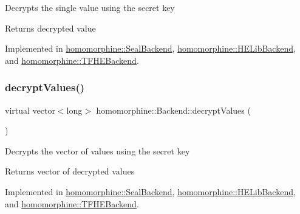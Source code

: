 Decrypts the single value using the secret key

\begin{DoxyReturn}{Returns}
decrypted value 
\end{DoxyReturn}


Implemented in \mbox{\hyperlink{classhomomorphine_1_1_seal_backend_a0496053defd79b8bd42d4d9c6b4b4ccc}{homomorphine\+::\+Seal\+Backend}}, \mbox{\hyperlink{classhomomorphine_1_1_h_e_lib_backend_a2cd3ebc5a3332100e6cb24480262c395}{homomorphine\+::\+H\+E\+Lib\+Backend}}, and \mbox{\hyperlink{classhomomorphine_1_1_t_f_h_e_backend_adb7f840ed97f29a58aa0282e4ae84f65}{homomorphine\+::\+T\+F\+H\+E\+Backend}}.

\mbox{\label{classhomomorphine_1_1_backend_a43638a85d3e1a85957f18be262c26f58}} 
\subsubsection{\texorpdfstring{decryptValues()}{decryptValues()}}
{\footnotesize\ttfamily virtual vector$<$long$>$ homomorphine\+::\+Backend\+::decrypt\+Values (\begin{DoxyParamCaption}{ }\end{DoxyParamCaption})\hspace{0.3cm}{\ttfamily [pure virtual]}}

Decrypts the vector of values using the secret key

\begin{DoxyReturn}{Returns}
vector of decrypted values 
\end{DoxyReturn}


Implemented in \mbox{\hyperlink{classhomomorphine_1_1_seal_backend_afa5f6cbb10d74c1911fcb88f722a0159}{homomorphine\+::\+Seal\+Backend}}, \mbox{\hyperlink{classhomomorphine_1_1_h_e_lib_backend_a650d87bee6056a404f8ab81ec0f84980}{homomorphine\+::\+H\+E\+Lib\+Backend}}, and \mbox{\hyperlink{classhomomorphine_1_1_t_f_h_e_backend_af57c6fc9c6acf324f2bcf20e6420155b}{homomorphine\+::\+T\+F\+H\+E\+Backend}}.

\mbox{\label{classhomomorphine_1_1_backend_ade5ea47921fae4c5117e11ed1097b7ce}} 

